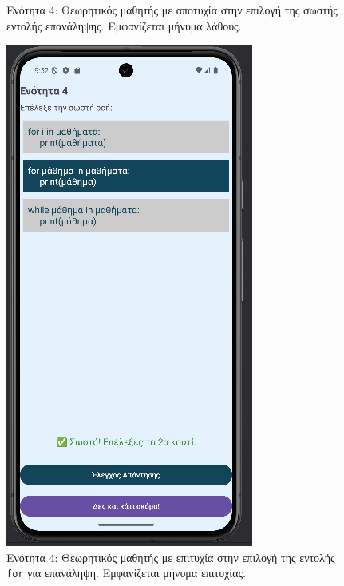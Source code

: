 \documentclass[11pt]{report}
\begin{document}
\begin{figure}[H]
\begin{minipage}[b]{0.45\textwidth}
    \caption{Ενότητα 4: Θεωρητικός μαθητής με αποτυχία στην επιλογή της σωστής εντολής επανάληψης. Εμφανίζεται μήνυμα λάθους.}
  \end{minipage}
  \hfill
  \begin{minipage}[b]{0.45\textwidth}
    \includegraphics[width=\linewidth, height=0.35\textheight, keepaspectratio]{Figures/εικόνα (21).png}
    \caption{Ενότητα 4: Θεωρητικός μαθητής με επιτυχία στην επιλογή της εντολής \texttt{for} για επανάληψη. Εμφανίζεται μήνυμα επιτυχίας.}
  \end{minipage}
\end{figure}
\end{document}
